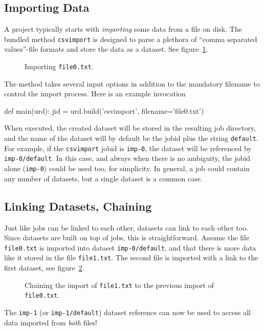\subsection{Importing Data}

A project typically starts with \textsl{importing} some data from a
file on disk.  The bundled method \texttt{csvimport} is designed to
parse a plethora of ``comma separated values''-file formats and store
the data as a dataset.  See figure~\ref{fig:dataset_csvimport}.
\begin{figure}[b]
  \begin{center}
    
    \caption{Importing \texttt{file0.txt}.}
    \label{fig:dataset_csvimport}
  \end{center}
\end{figure}
The method takes several input options in addition to the mandatory
filename to control the import process.  Here is an example
invocation
\begin{python}
def main(urd):
    jid = urd.build('csvimport', filename='file0.txt')
\end{python}
When executed, the created dataset will be stored in the resulting job
directory, and the name of the dataset will by default be the jobid
plus the string \texttt{default}.  For example, if the
\texttt{csvimport} jobid is \texttt{imp-0}, the dataset will be
referenced by \texttt{imp-0/default}.  In this case, and always when
there is no ambiguity, the jobid alone (\texttt{imp-0}) could be used
too, for simplicity.  In general, a job could contain any number of
datasets, but a single dataset is a common case.




\subsection{Linking Datasets, Chaining}

Just like jobs can be linked to each other, datasets can link to each
other too.  Since datasets are built on top of jobs, this is
straightforward.  Assume the file \texttt{file0.txt} is imported into
dataset \texttt{imp-0/default}, and that there is more data like it
stored in the file \texttt{file1.txt}.  The second file is imported
with a link to the first dataset, see
figure~\ref{fig:dataset_csvimport_chain}.
\begin{figure}[t]
  \begin{center}
    
    \caption{Chaining the import of \texttt{file1.txt} to the previous
      import of \texttt{file0.txt}.}
    \label{fig:dataset_csvimport_chain}
  \end{center}
\end{figure}
The \texttt{imp-1} (or \texttt{imp-1/default}) dataset reference can
now be used to access all data imported from \textsl{both} files!

